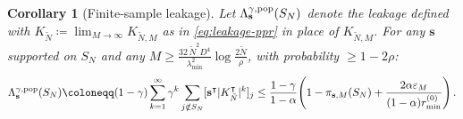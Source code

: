 \documentclass{article}
\theoremstyle{plain}
\newtheorem{corollary}{Corollary}[theorem]
\theoremstyle{definition}
\def\tp{\intercal}
\begin{document}
\begin{corollary}[Finite-sample leakage]\label{cor:finite-sample-leakage}
	Let $\Lambda_{\mathbf{s}}^{\gamma,\textnormal{pop}}(S_N)$ denote the leakage defined with $K_{\tilde{N}} \coloneqq \lim_{M\to\infty} K_{\tilde{N},M}$ as in  \eqref{eq:leakage-ppr} in place of $K_{\tilde{N},M}$. For any $\mathbf{s}$ supported on $S_N$ and any $M \geq \frac{32\,\tilde{N}^2 D^4}{\lambda_{\min}^2}\log\frac{2\tilde{N}}{\rho}$, with probability $\geq 1-2\rho$:
	\begin{equation}\label{eq:finite-sample-leakage}
		\Lambda_{\mathbf{s}}^{\gamma,\textnormal{pop}}(S_N) \coloneqq(1-\gamma)\sum_{k=1}^{\infty} \gamma^k \sum_{j \notin S_N} [\mathbf{s}^\tp  |K_{\tilde{N}}^{\tp}|^k]_j \leq \frac{1-\gamma}{1-\alpha}\!\left(1 - \pi_{\mathbf{s}, M}(S_N) + \frac{2\alpha\varepsilon_M}{(1-\alpha)r^{(0)}_{\min}}\right).
	\end{equation}
\end{corollary}
\end{document}

